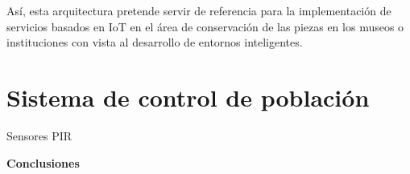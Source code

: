     \vspace{6cm}

    Así, esta arquitectura pretende servir de referencia para la implementación de servicios basados en IoT en el área de conservación de las piezas en los museos o instituciones con vista al desarrollo de entornos inteligentes.\\


    \section{Sistema de control de población}\label{sec: sistemaSeguridad}
    Sensores PIR\\

    \textbf{\Large Conclusiones}\newline